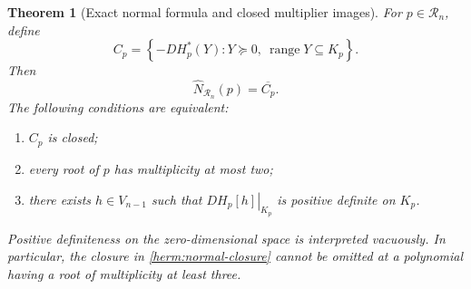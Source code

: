 \documentclass[reqno]{amsart}
\newtheorem{theorem}{Theorem}[section]
\theoremstyle{definition}
\theoremstyle{remark}
\begin{document}
\begin{theorem}[Exact normal formula and closed multiplier images]
\label{herm:closed}
For $p\in\mathcal R_n$, define
\begin{equation}
 C_p=\left\{-DH_p^*(Y):
       Y\succeq0,\ \operatorname{range}Y\subseteq K_p\right\}.
 \label{herm:multiplier-image}
\end{equation}
Then
\begin{equation}
 \widehat N_{\mathcal R_n}(p)=\overline{C_p}.
 \label{herm:normal-closure}
\end{equation}
The following conditions are equivalent:
\begin{enumerate}
 \item $C_p$ is closed;
 \item every root of $p$ has multiplicity at most two;
 \item there exists $h\in V_{n-1}$ such that
       $\left.DH_p[h]\right|_{K_p}$ is positive definite on $K_p$.
\end{enumerate}
Positive definiteness on the zero-dimensional space is interpreted
vacuously.  In particular, the closure in
\eqref{herm:normal-closure} cannot be omitted at a polynomial having a
root of multiplicity at least three.
\end{theorem}
\end{document}
